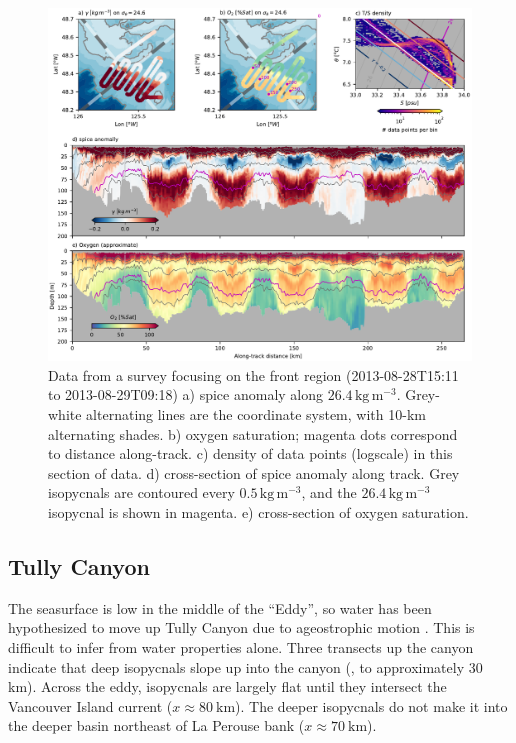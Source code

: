 \documentclass[draft]{agujournal2019}
\begin{document}
\begin{figure}[htbp]
  \begin{center}
    \includegraphics[width=6.2in]{Frontsurvey}
    \caption{Data from a survey focusing on the front region (2013-08-28T15:11 to 2013-08-29T09:18) a) spice anomaly along $26.4\,\mathrm{kg\,m^{-3}}$.  Grey-white alternating lines are the coordinate system, with 10-km alternating shades.   b) oxygen saturation; magenta dots correspond to distance along-track. c) density of data points (logscale) in this section of data.  d) cross-section of spice anomaly along track.  Grey isopycnals are contoured every $0.5\,\mathrm{kg\,m^{-3}}$, and the $26.4\,\mathrm{kg\,m^{-3}}$ isopycnal is shown in magenta.  e) cross-section of oxygen saturation.
      \label{fig:Frontsurvey} }
  \end{center}
\end{figure}

\subsection{Tully Canyon}

The seasurface is low in the middle of the ``Eddy'', so water has been hypothesized to move up Tully Canyon due to ageostrophic motion \cite{weaverhsieh87,freelanddenman82}.  This is difficult to infer from water properties alone.  Three transects up the canyon indicate that deep isopycnals slope up into the canyon (, to approximately 30 km).  Across the eddy, isopycnals are largely flat until they intersect the Vancouver Island current ($x\approx 80\ \mathrm{km}$).  The deeper isopycnals do not make it into the deeper basin northeast of La Perouse bank ($x\approx 70\ \mathrm{km}$).
\end{document}
